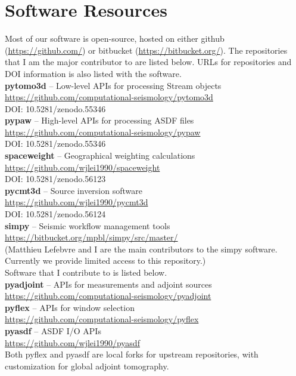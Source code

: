\chapter{Software Resources\label{ch:implementation}}
\label{ch:software_resource}

Most of our software is open-source, hosted on either github (\url{https://github.com/}) or bitbucket (\url{https://bitbucket.org/}).
The repositories that I am the major contributor to are listed below. URLs for
repositories and DOI information is also listed with the software.\\

\noindent \textbf{pytomo3d} -- Low-level APIs for processing Stream objects\\
\url{https://github.com/computational-seismology/pytomo3d}\\
DOI: 10.5281/zenodo.55346\\

\noindent \textbf{pypaw} -- High-level APIs for processing ASDF files\\
\url{https://github.com/computational-seismology/pypaw}\\
DOI: 10.5281/zenodo.55346\\

\noindent \textbf{spaceweight} -- Geographical weighting calculations\\
\url{https://github.com/wjlei1990/spaceweight}\\
DOI: 10.5281/zenodo.56123\\

\noindent \textbf{pycmt3d} -- Source inversion software\\
\url{https://github.com/wjlei1990/pycmt3d}\\
DOI: 10.5281/zenodo.56124\\

\noindent \textbf{simpy} -- Seismic workflow management tools\\
\url{https://bitbucket.org/mpbl/simpy/src/master/}\\
(Matthieu Lefebvre and I are the main contributors to the simpy software.
Currently we provide limited access to this repository.)\\

Software that I contribute to is listed below.\\

\noindent \textbf{pyadjoint} -- APIs for measurements and adjoint sources\\
\url{https://github.com/computational-seismology/pyadjoint}\\

\noindent \textbf{pyflex} -- APIs for window selection\\
\url{https://github.com/computational-seismology/pyflex}\\

\noindent \textbf{pyasdf} -- ASDF I/O APIs\\
\url{https://github.com/wjlei1990/pyasdf}\\

Both pyflex and pyasdf are local forks for upstream repositories,
with customization for global adjoint tomography.
